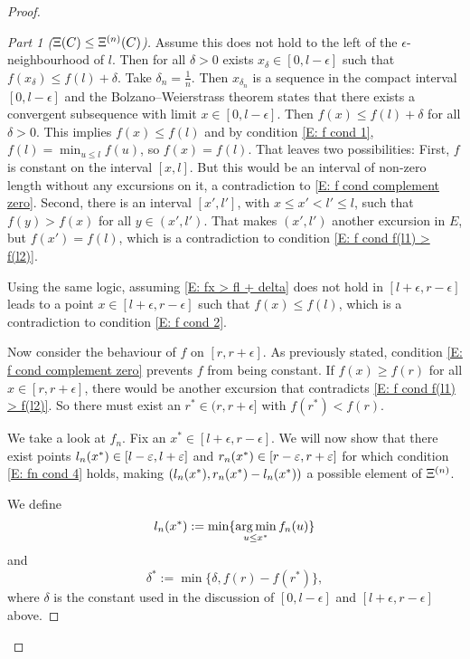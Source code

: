 \begin{proof}
\begin{proof}[Part 1 ($\Xi(C) \leq \Xi^{(n)}(C)$)]
Assume this does not hold to the left of the $\epsilon$-neighbourhood of $l$.
Then for all $\delta > 0$ exists $x_{\delta} \in [0, l - \epsilon]$ such that
$f(x_{\delta}) \leq f(l) + \delta$.
Take $\delta_n = \frac{1}{n}$. 
Then $x_{\delta_n}$ is a sequence in the compact interval $[0, l - \epsilon]$
and the Bolzano–Weierstrass theorem states that there exists a convergent subsequence with limit $x \in [0, l - \epsilon]$.
Then $f(x) \leq f(l) + \delta$ for all $\delta > 0$.
This implies $f(x) \leq f(l)$ and by condition \eqref{E: f cond 1},
$f(l) = \min_{u \leq l}f(u)$,
so $f(x) = f(l)$.
That leaves two possibilities:
First, $f$ is constant on the interval $[x,l]$.
But this would be an interval of non-zero length without any excursions on it,
a contradiction to \eqref{E: f cond complement zero}.
Second, there is an interval
$[x', l']$, with $x\leq x'<l' \leq l$,
such that $f(y) > f(x)$ for all $y \in (x',l')$.
That makes $(x',l')$ another excursion in $E$,
but $f(x') = f(l)$,
which is a contradiction to condition \eqref{E: f cond f(l1) > f(l2)}.

Using the same logic,
assuming \eqref{E: fx > fl + delta} does not hold in $[l + \epsilon, r- \epsilon]$
leads to a point $x \in [l + \epsilon, r- \epsilon]$
such that $f(x) \leq f(l)$,
which is a contradiction to condition \eqref{E: f cond 2}.

Now consider the behaviour of $f$ on $[r, r + \epsilon]$.
As previously stated, 
condition \eqref{E: f cond complement zero} prevents $f$ from being constant.
If $f(x) \geq f(r)$ for all $x \in [r, r + \epsilon]$,
there would be another excursion that contradicts \eqref{E: f cond f(l1) > f(l2)}.
So there must exist an $r^* \in (r, r + \epsilon]$ with $f(r^*) < f(r)$.

\bigskip

We take a look at $f_n$.
Fix an $x^* \in [l+\epsilon, r-\epsilon]$.
We will now show that there exist points
$l_n(x^*) \in [l-\varepsilon, l+\varepsilon]$
and 
$r_n(x^*) \in [r-\varepsilon, r+\varepsilon]$
for which condition \eqref{E: fn cond 4} holds,
making $(l_n(x^*), r_n(x^*)- l_n(x^*))$ a possible element of $\Xi^{(n)}$.

We define 
\begin{equation} \label{D: lnx}
l_n(x^*) := \min\{\operatorname*{arg\,min}_{u \leq x^*} f_n(u)\}
\end{equation}
and 
\begin{equation} \label{D: delta star}
\delta^* := \min\{ \delta, f(r) - f(r^*) \},
\end{equation}
where $\delta$ is the constant used in the discussion of
$[0, l-\epsilon]$ and $[l+\epsilon, r-\epsilon]$ above.


\end{proof}
\end{proof}
